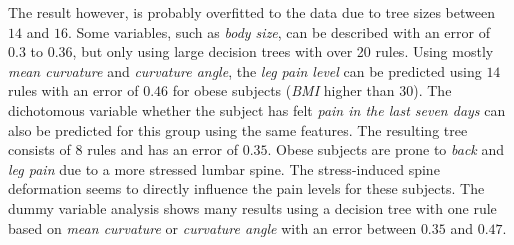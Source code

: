 \documentclass[a4paper,twoside]{style/article}
\begin{document}
The result however, is probably overfitted to the data due to tree sizes between $14$ and $16$.
Some variables, such as \emph{body size}, can be described with an error of $0.3$ to $0.36$, but only using large decision trees with over 20 rules.
Using mostly \emph{mean curvature} and \emph{curvature angle}, the \emph{leg pain level} can be predicted using $14$ rules with an error of $0.46$ for obese subjects (\emph{BMI} higher than $30$).
The dichotomous variable whether the subject has felt \emph{pain in the last seven days} can also be predicted for this group using the same features.
The resulting tree consists of $8$ rules and has an error of $0.35$.
Obese subjects are prone to \emph{back} and \emph{leg pain} due to a more stressed lumbar spine.
The stress-induced spine deformation seems to directly influence the pain levels for these subjects.
The dummy variable analysis shows many results using a decision tree with one rule based on \emph{mean curvature} or \emph{curvature angle} with an error between $0.35$ and $0.47$.
\end{document}
